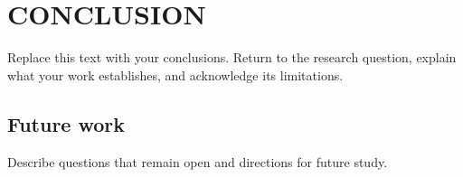 \chapter{CONCLUSION}
\label{chap:conclusion}

Replace this text with your conclusions. Return to the research question,
explain what your work establishes, and acknowledge its limitations.

\section{Future work}
Describe questions that remain open and directions for future study.
